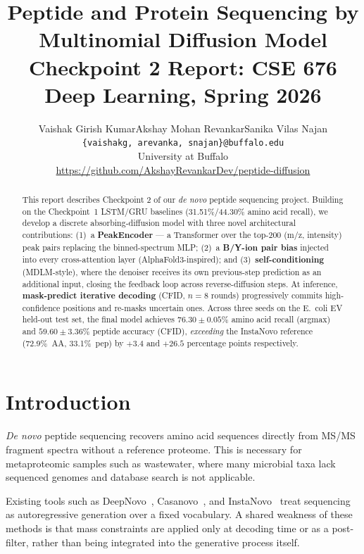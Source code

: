 \documentclass[11pt]{article}
\title{Peptide and Protein Sequencing by Multinomial Diffusion Model\\
\large Checkpoint 2 Report: CSE 676 Deep Learning, Spring 2026}
\author{%
  Vaishak Girish Kumar\quad Akshay Mohan Revankar\quad Sanika Vilas Najan \\
  \texttt{\{vaishakg, arevanka, snajan\}@buffalo.edu} \\
  University at Buffalo \\
  \small\url{https://github.com/AkshayRevankarDev/peptide-diffusion}
}
\begin{document}
\maketitle

\begin{abstract}
This report describes Checkpoint 2 of our \emph{de novo} peptide sequencing project.
Building on the Checkpoint~1 LSTM/GRU baselines (31.51\%/44.30\% amino acid recall),
we develop a discrete absorbing-diffusion model with three novel architectural
contributions: (1)~a \textbf{PeakEncoder} --- a Transformer over the top-200
(m/z, intensity) peak pairs replacing the binned-spectrum MLP; (2)~a \textbf{B/Y-ion
pair bias} injected into every cross-attention layer (AlphaFold3-inspired); and
(3)~\textbf{self-conditioning} (MDLM-style), where the denoiser receives its own
previous-step prediction as an additional input, closing the feedback loop across
reverse-diffusion steps.
At inference, \textbf{mask-predict iterative decoding} (CFID, $n{=}8$ rounds)
progressively commits high-confidence positions and re-masks uncertain ones.
Across three seeds on the E.~coli EV held-out test set, the final model achieves
$\mathbf{76.30 \pm 0.05\%}$ amino acid recall (argmax) and
$\mathbf{59.60 \pm 3.36\%}$ peptide accuracy (CFID), \emph{exceeding} the
InstaNovo reference (72.9\%~AA, 33.1\%~pep) by $+3.4$ and $+26.5$ percentage
points respectively.
\end{abstract}

\section{Introduction}

\emph{De novo} peptide sequencing recovers amino acid sequences directly from MS/MS
fragment spectra without a reference proteome. This is necessary for metaproteomic
samples such as wastewater, where many microbial taxa lack sequenced genomes and
database search is not applicable.

Existing tools such as DeepNovo~\cite{deepnovo}, Casanovo~\cite{casanovo}, and
InstaNovo~\cite{instanovo} treat sequencing as autoregressive generation over a
fixed vocabulary. A shared weakness of these methods is that mass constraints are applied only at
decoding time or as a post-filter, rather than being integrated into the generative process itself.
\end{document}

